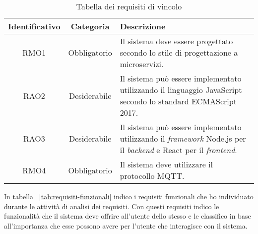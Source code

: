 \begin{table}[H]
\caption{Tabella dei requisiti di vincolo}
\label{tab:requisiti-vincolo}
\begin{tabularx}{\linewidth}{|c|c|X|}
\hline
\textbf{Identificativo} & \textbf{Categoria} & \textbf{Descrizione} \\
\hline
RMO1 & Obbligatorio & Il sistema deve essere progettato secondo lo stile di progettazione a microservizi. \\
\hline
RAO2 & Desiderabile & Il sistema può essere implementato utilizzando il linguaggio JavaScript secondo lo standard ECMAScript 2017. \\
\hline
RAO3 & Desiderabile & Il sistema può essere implementato utilizzando il \emph{framework} Node.js per il \emph{backend} e React per il \emph{frontend}. \\
\hline
RMO4 & Obbligatorio & Il sistema deve utilizzare il protocollo MQTT. \\
\hline
\end{tabularx}
\end{table}

In tabella ~\ref{tab:requisiti-funzionali} indico i requisiti funzionali che ho individuato durante le attività di analisi dei requisiti. Con questi requisiti indico le funzionalità che il sistema deve offrire all'utente dello stesso e le classifico in base all'importanza che esse possono avere per l'utente che interagisce con il sistema.

